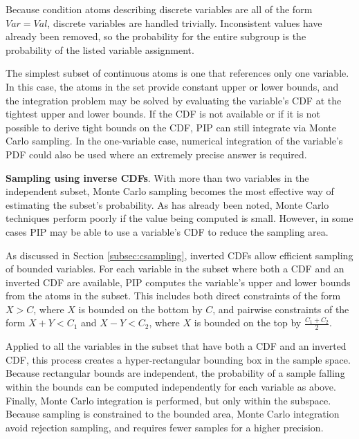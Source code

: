 Because condition atoms describing discrete variables are all of the form $Var = Val$, discrete variables are handled trivially.  Inconsistent values have already been removed, so the probability for the entire subgroup is the probability of the listed variable assignment.

The simplest subset of continuous atoms is one that references only one variable.  In this case, the atoms in the set provide constant upper or lower bounds, and the integration problem may be solved by evaluating the variable's CDF at the tightest upper and lower bounds.  If the CDF is not available or if it is not possible to derive tight bounds on the CDF, PIP can still integrate via Monte Carlo sampling.  In the one-variable case, numerical integration of the variable's PDF could also be used where an extremely precise answer is required.

{\bf Sampling using inverse CDFs}.
With more than two variables in the independent subset, Monte Carlo sampling becomes the most effective way of estimating the subset's probability.  As has already been noted, Monte Carlo techniques perform poorly if the value being computed is small.  However, in some cases PIP may be able to use a variable's CDF to reduce the sampling area.  

As discussed in Section \ref{subsec:csampling}, inverted CDFs allow efficient sampling of bounded variables.  For each variable in the subset where both a CDF and an inverted CDF are available, PIP computes the variable's upper and lower bounds from the atoms in the subset.  This includes both direct constraints of the form $X > C$, where $X$ is bounded on the bottom by $C$, and pairwise constraints of the form $X + Y < C_1$ and $X - Y < C_2$, where $X$ is bounded on the top by $\frac{C_1+C_2}{2}$.  

Applied to all the variables in the subset that have both a CDF and an inverted CDF, this process creates a hyper-rectangular bounding box in the sample space.  Because rectangular bounds are independent, the probability of a sample falling within the bounds can be computed independently for each variable as above.  Finally, Monte Carlo integration is performed, but only within the subspace.
%
%
Because  sampling is  constrained  to the  bounded  area, Monte  Carlo
integration avoid rejection sampling, and requires fewer samples for a
higher precision.


